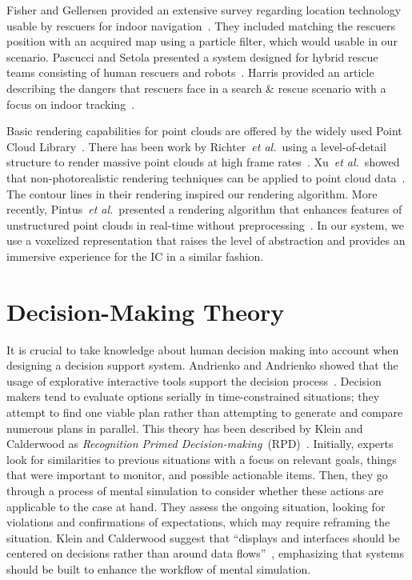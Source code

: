 \documentclass{egpubl}
\def\etal{\textit{et al.}}
\begin{document}
 Fisher and Gellersen provided an extensive survey regarding location technology usable by rescuers for indoor navigation~\cite{fischer2010location}. They included matching the rescuers position with an acquired map using a particle filter, which would usable in our scenario. Pascucci and Setola presented a system designed for hybrid rescue teams consisting of human rescuers and robots~\cite{pascucci2011indoor}. Harris provided an article describing the dangers that rescuers face in a search \& rescue scenario with a focus on indoor tracking~\cite{harris2013way}. 

 Basic rendering capabilities for point clouds are offered by the widely used Point Cloud Library~\cite{Rusu11ICRA}. There has been work by Richter~\etal\ using a level-of-detail structure to render massive point clouds at high frame rates~\cite{Richter:2010:ORV:1811158.1811178}. Xu~\etal\ showed that non-photorealistic rendering techniques can be applied to point cloud data~\cite{conf/npar/XuC04}. The contour lines in their rendering inspired our rendering algorithm. More recently, Pintus~\etal\ presented a rendering algorithm that enhances features of unstructured point clouds in real-time without preprocessing~\cite{Pintus:2011:RRM:2384495.2384513}. In our system, we use a voxelized representation that raises the level of abstraction and provides an immersive experience for the IC in a similar fashion.


\section{Decision-Making Theory} \label{sec:theory}
It is crucial to take knowledge about human decision making into account when designing a decision support system. Andrienko and Andrienko showed that the usage of explorative interactive tools support the decision process~\cite{Andrienko:2003kv}. Decision makers tend to evaluate options serially in time-constrained situations; they attempt to find one viable plan rather than attempting to generate and compare numerous plans in parallel. This theory has been described by Klein and Calderwood as \emph{Recognition Primed Decision-making}~(RPD)~\cite{KleinCalderwood}. Initially, experts look for similarities to previous situations with a focus on relevant goals, things that were important to monitor, and possible actionable items. Then, they go through a process of mental simulation to consider whether these actions are applicable to the case at hand. They assess the ongoing situation, looking for violations and confirmations of expectations, which may require reframing the situation. Klein and Calderwood suggest that ``displays and interfaces should be centered on decisions rather than around data flows''~\cite{KleinCalderwood}, emphasizing that systems should be built to enhance the workflow of mental simulation. 
\end{document}
